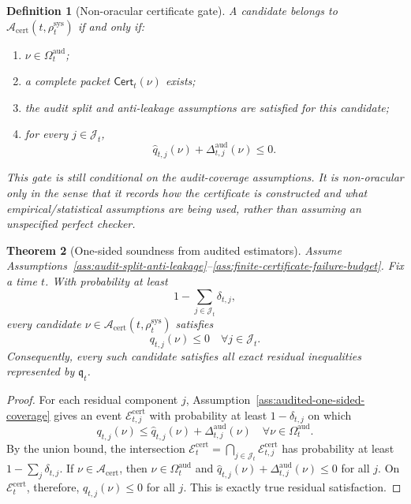 \documentclass[11pt,a4paper]{article}
\newtheorem{theorem}{Theorem}[section]
\newtheorem{definition}[theorem]{Definition}
\newcommand{\Acal}{\mathcal A}
\newcommand{\Ecal}{\mathcal E}
\newcommand{\sys}{\mathrm{sys}}
\newcommand{\aud}{\mathrm{aud}}
\newcommand{\cert}{\mathrm{cert}}
\begin{document}
\begin{definition}[Non-oracular certificate gate]
\label{def:non-oracular-certificate-gate}
A candidate belongs to \(\Acal_{\cert}(t,\rho_t^{\sys})\) if and only if:
\begin{enumerate}[label=(\roman*),leftmargin=1.5em]
    \item \(\nu\in\Omega_t^{\aud}\);
    \item a complete packet \(\mathsf{Cert}_t(\nu)\) exists;
    \item the audit split and anti-leakage assumptions are satisfied for this candidate;
    \item for every \(j\in\mathcal J_t\),
    \[
    \widehat q_{t,j}(\nu)+\Delta_{t,j}^{\aud}(\nu)\le0.
    \]
\end{enumerate}
This gate is still conditional on the audit-coverage assumptions. It is non-oracular only in the sense that it records how the certificate is constructed and what empirical/statistical assumptions are being used, rather than assuming an unspecified perfect checker.
\end{definition}

\begin{theorem}[One-sided soundness from audited estimators]
\label{thm:audited-one-sided-soundness}
Assume Assumptions~\ref{ass:audit-split-anti-leakage}--\ref{ass:finite-certificate-failure-budget}. Fix a time \(t\). With probability at least
\[
1-\sum_{j\in\mathcal J_t}\delta_{t,j},
\]
every candidate \(\nu\in\Acal_{\cert}(t,\rho_t^{\sys})\) satisfies
\[
q_{t,j}(\nu)\le0
\quad\forall j\in\mathcal J_t.
\]
Consequently, every such candidate satisfies all exact residual inequalities represented by \(\mathfrak q_t\).
\end{theorem}

\begin{proof}
For each residual component \(j\), Assumption~\ref{ass:audited-one-sided-coverage} gives an event \(\Ecal_{t,j}^{\cert}\) with probability at least \(1-\delta_{t,j}\) on which
\[
q_{t,j}(\nu)\le \widehat q_{t,j}(\nu)+\Delta_{t,j}^{\aud}(\nu)
\quad\forall \nu\in\Omega_t^{\aud}.
\]
By the union bound, the intersection \(\Ecal_t^{\cert}=\bigcap_{j\in\mathcal J_t}\Ecal_{t,j}^{\cert}\) has probability at least \(1-\sum_j\delta_{t,j}\). If \(\nu\in\Acal_{\cert}\), then \(\nu\in\Omega_t^{\aud}\) and \(\widehat q_{t,j}(\nu)+\Delta_{t,j}^{\aud}(\nu)\le0\) for all \(j\). On \(\Ecal_t^{\cert}\), therefore, \(q_{t,j}(\nu)\le0\) for all \(j\). This is exactly true residual satisfaction.
\end{proof}
\end{document}
